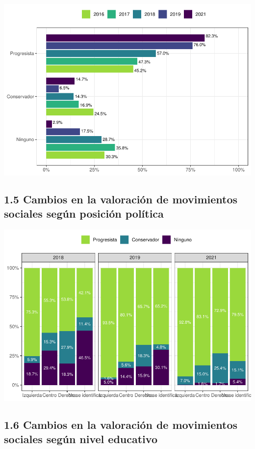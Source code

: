 \documentclass[
  12pt,
  openany]{book}
\begin{document}
\includegraphics{reporte-elsoc_files/figure-latex/unnamed-chunk-9-1.pdf}

\hypertarget{cambios-en-la-valoraciuxf3n-de-movimientos-sociales-seguxfan-posiciuxf3n-poluxedtica}{%
\subsection{1.5 Cambios en la valoración de movimientos sociales según posición política}\label{cambios-en-la-valoraciuxf3n-de-movimientos-sociales-seguxfan-posiciuxf3n-poluxedtica}}

\includegraphics{reporte-elsoc_files/figure-latex/unnamed-chunk-10-1.pdf}

\hypertarget{cambios-en-la-valoraciuxf3n-de-movimientos-sociales-seguxfan-nivel-educativo}{%
\subsection{1.6 Cambios en la valoración de movimientos sociales según nivel educativo}\label{cambios-en-la-valoraciuxf3n-de-movimientos-sociales-seguxfan-nivel-educativo}}
\end{document}

